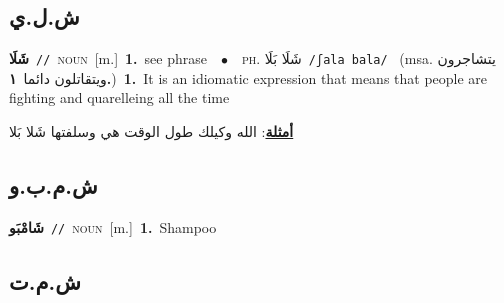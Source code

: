 \documentclass[10pt,a4paper,twoside]{article} %
\begin{document}
\begin{multicols}{2}
\vspace{-3mm}
\subsection*{\color{blue}\foreignlanguage{arabic}{ش.ل.ي}\color{blue}{}} 

{\setlength\topsep{0pt}\textbf{\foreignlanguage{arabic}{شَلَا}}\ {\color{gray}\texttt{//}\color{black}}\ \textsc{noun}\ [m.]\ \textbf{1.}~see phrase\ \ $\bullet$\ \ \textsc{ph.} \color{gray} \foreignlanguage{arabic}{شَلَا بَلَا}\color{black}\ {\color{gray}\texttt{/{\sffamily ʃala bala}/}\color{black}}\ \color{gray} (msa. \foreignlanguage{arabic}{يتشاجرون ويتقاتلون دائما}~\foreignlanguage{arabic}{\textbf{١.}})\color{black}\ \textbf{1.}~It is an idiomatic expression that means that people are fighting and quarelleing all the time\  \begin{flushright}\color{gray}\foreignlanguage{arabic}{\textbf{\underline{\foreignlanguage{arabic}{أمثلة}}}: الله وكيلك طول الوقت هي وسلفتها شَلا بَلا}\end{flushright}\color{black}} \vspace{2mm}

\vspace{-3mm}
\subsection*{\color{blue}\foreignlanguage{arabic}{ش.م.ب.و}\color{blue}{ (ntws)}} 

{\setlength\topsep{0pt}\textbf{\foreignlanguage{arabic}{شَامْبَو}}\ {\color{gray}\texttt{//}\color{black}}\ \textsc{noun}\ [m.]\ \textbf{1.}~Shampoo\ } \vspace{2mm}

\vspace{-3mm}
\subsection*{\color{blue}\foreignlanguage{arabic}{ش.م.ت}\color{blue}{}} 


\end{multicols}
\end{document}
